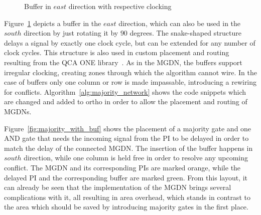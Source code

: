 \begin{figure}
	\caption{Buffer in $east$ direction with respective clocking}\label{fig:QCA_buf}
\end{figure}

Figure~\ref{fig:QCA_buf} depicts a buffer in the $east$ direction, which can also be used in the $south$ direction by just rotating it by $90$ degrees. The snake-shaped structure delays a signal by exactly one clock cycle, but can be extended for any number of clock cycles. This structure is also used in custom placement and routing resulting from the QCA ONE library~\cite{QCA_scl}. As in the MGDN, the buffers support irregular clocking, creating zones through which the algorithm cannot wire. In the case of buffers only one column or row is made impassable, introducing a rewiring for conflicts. Algorithm~\ref{alg:majority_network} shows the code snippets which are changed and added to ortho in order to allow the placement and routing of MGDNs.

Figure~\ref{fig:majority_with_buf} shows the placement of a majority gate and one AND gate that needs the incoming signal from the PI to be delayed in order to match the delay of the connected MGDN. The insertion of the buffer happens in $south$ direction, while one column is held free in order to resolve any upcoming conflict. The MGDN and its corresponding PIs are marked orange, while the delayed PI and the corresponding buffer are marked green. From this layout, it can already be seen that the implementation of the MGDN brings several complications with it, all resulting in area overhead, which stands in contrast to the area which should be saved by introducing majority gates in the first place.

